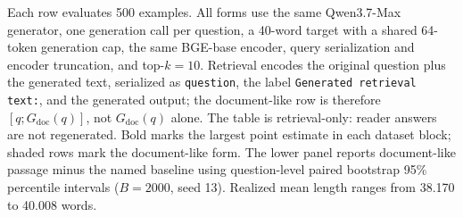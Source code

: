 \begin{table}[t]
\begin{threeparttable}
\begin{tabularx}{\textwidth}{l >{\raggedright\arraybackslash}X r r r}
\bottomrule
\end{tabularx}
\begin{tablenotes}
\footnotesize
\item Each row evaluates 500 examples. All forms use the same Qwen3.7-Max generator, one generation call per question, a 40-word target with a shared 64-token generation cap, the same BGE-base encoder, query serialization and encoder truncation, and top-$k=10$. Retrieval encodes the original question plus the generated text, serialized as \texttt{question}, the label \texttt{Generated retrieval text:}, and the generated output; the document-like row is therefore $[q;G_{\mathrm{doc}}(q)]$, not $G_{\mathrm{doc}}(q)$ alone. The table is retrieval-only: reader answers are not regenerated. Bold marks the largest point estimate in each dataset block; shaded rows mark the document-like form. The lower panel reports document-like passage minus the named baseline using question-level paired bootstrap 95\% percentile intervals ($B=2000$, seed 13). Realized mean length ranges from 38.170 to 40.008 words.
\end{tablenotes}
\end{threeparttable}
\end{table}
